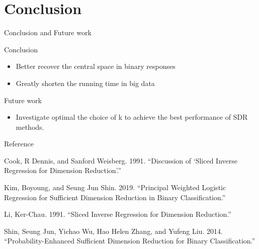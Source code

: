 \documentclass[ignorenonframetext,]{beamer}
\providecommand{\tightlist}{%
  \setlength{\itemsep}{0pt}\setlength{\parskip}{0pt}}
\begin{document}
\section{Conclusion}\label{conclusion}

\begin{frame}{Conclusion and Future work}

\begin{block}{Conclusion}

\begin{itemize}
\tightlist
\item
  Better recover the central space in binary responses
\item
  Greatly shorten the running time in big data
\end{itemize}

\end{block}

\begin{block}{Future work}

\begin{itemize}
\tightlist
\item
  Investigate optimal the choice of k to achieve the best performance of
  SDR methods.
\end{itemize}

\end{block}

\end{frame}

\begin{frame}{Reference}

\hypertarget{refs}{}
\hypertarget{ref-ref7}{}
Cook, R Dennis, and Sanford Weisberg. 1991. ``Discussion of `Sliced
Inverse Regression for Dimension Reduction'.''

\hypertarget{ref-ref9}{}
Kim, Boyoung, and Seung Jun Shin. 2019. ``Principal Weighted Logistic
Regression for Sufficient Dimension Reduction in Binary
Classification.''

\hypertarget{ref-ref6}{}
Li, Ker-Chau. 1991. ``Sliced Inverse Regression for Dimension
Reduction.''

\hypertarget{ref-ref8}{}
Shin, Seung Jun, Yichao Wu, Hao Helen Zhang, and Yufeng Liu. 2014.
``Probability-Enhanced Sufficient Dimension Reduction for Binary
Classification.''

\end{frame}
\end{document}
